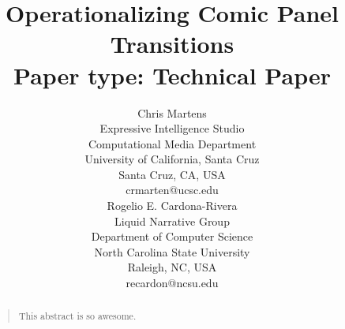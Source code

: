 \documentclass[letterpaper]{article}
\title{Operationalizing Comic Panel Transitions \\
Paper type: Technical Paper}
\author{
	Chris Martens\\
	Expressive Intelligence Studio\\
	Computational Media Department\\
	University of California, Santa Cruz\\
	Santa Cruz, CA, USA\\
	crmarten@ucsc.edu\\
	\And
	Rogelio E. Cardona-Rivera\\
	Liquid Narrative Group\\
	Department of Computer Science\\
	North Carolina State University\\
	Raleigh, NC, USA\\
	recardon@ncsu.edu\\
}
\begin{document}
 
\maketitle
\begin{abstract}
	\begin{quote}
		This abstract is so awesome.
	\end{quote}
\end{abstract}


















\end{document}
